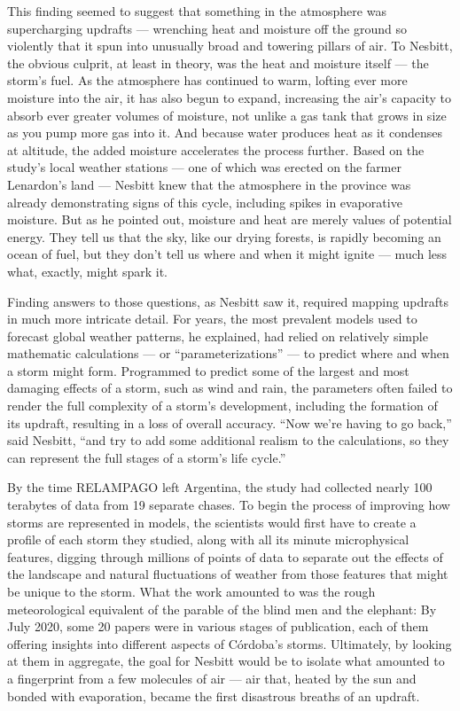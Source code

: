 This finding seemed to suggest that something in the atmosphere was
supercharging updrafts --- wrenching heat and moisture off the ground so
violently that it spun into unusually broad and towering pillars of air.
To Nesbitt, the obvious culprit, at least in theory, was the heat and
moisture itself --- the storm's fuel. As the atmosphere has continued to
warm, lofting ever more moisture into the air, it has also begun to
expand, increasing the air's capacity to absorb ever greater volumes of
moisture, not unlike a gas tank that grows in size as you pump more gas
into it. And because water produces heat as it condenses at altitude,
the added moisture accelerates the process further. Based on the study's
local weather stations --- one of which was erected on the farmer
Lenardon's land --- Nesbitt knew that the atmosphere in the province was
already demonstrating signs of this cycle, including spikes in
evaporative moisture. But as he pointed out, moisture and heat are
merely values of potential energy. They tell us that the sky, like our
drying forests, is rapidly becoming an ocean of fuel, but they don't
tell us where and when it might ignite --- much less what, exactly,
might spark it.

Finding answers to those questions, as Nesbitt saw it, required mapping
updrafts in much more intricate detail. For years, the most prevalent
models used to forecast global weather patterns, he explained, had
relied on relatively simple mathematic calculations --- or
``parameterizations'' --- to predict where and when a storm might form.
Programmed to predict some of the largest and most damaging effects of a
storm, such as wind and rain, the parameters often failed to render the
full complexity of a storm's development, including the formation of its
updraft, resulting in a loss of overall accuracy. ``Now we're having to
go back,'' said Nesbitt, ``and try to add some additional realism to the
calculations, so they can represent the full stages of a storm's life
cycle.''

By the time RELAMPAGO left Argentina, the study had collected nearly 100
terabytes of data from 19 separate chases. To begin the process of
improving how storms are represented in models, the scientists would
first have to create a profile of each storm they studied, along with
all its minute microphysical features, digging through millions of
points of data to separate out the effects of the landscape and natural
fluctuations of weather from those features that might be unique to the
storm. What the work amounted to was the rough meteorological equivalent
of the parable of the blind men and the elephant: By July 2020, some 20
papers were in various stages of publication, each of them offering
insights into different aspects of Córdoba's storms. Ultimately, by
looking at them in aggregate, the goal for Nesbitt would be to isolate
what amounted to a fingerprint from a few molecules of air --- air that,
heated by the sun and bonded with evaporation, became the first
disastrous breaths of an updraft.

